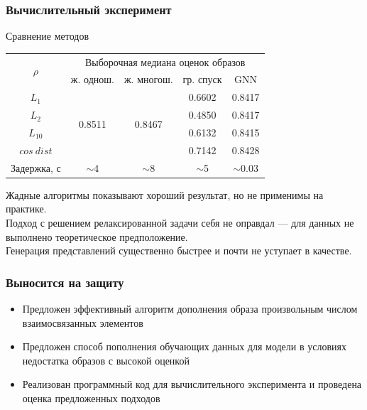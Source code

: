 \documentclass[10pt]{beamer}
\begin{document}
\begin{frame}
	\frametitle{Вычислительный эксперимент}
	\begin{block}{Сравнение методов}
		\begin{center}
			\begin{tabular}{|c|cccc|}
				\hline
				\multirow{2}{*}{$\rho$} & \multicolumn{4}{c|}{Выборочная медиана оценок образов}                                                                       \\ \cline{2-5} 
				& \multicolumn{1}{c|}{ж. однош.}            & \multicolumn{1}{c|}{ж. многош.}           & \multicolumn{1}{c|}{гр. спуск} & GNN \\ \hline
				$L_1$                   & \multicolumn{1}{c|}{\multirow{4}{*}{0.8511}} & \multicolumn{1}{c|}{\multirow{4}{*}{0.8467}} & \multicolumn{1}{c|}{0.6602}         & 0.8417    \\ \cline{1-1} \cline{4-5} 
				$L_2$                   & \multicolumn{1}{c|}{}                     & \multicolumn{1}{c|}{}                     & \multicolumn{1}{c|}{0.4850}         & 0.8417  \\ \cline{1-1} \cline{4-5} 
				$L_{10}$                & \multicolumn{1}{c|}{}                     & \multicolumn{1}{c|}{}                     & \multicolumn{1}{c|}{0.6132}         &  0.8415  \\ \cline{1-1}\cline{4-5} 
				$cos~dist$              & \multicolumn{1}{c|}{}                     & \multicolumn{1}{c|}{}                     & \multicolumn{1}{c|}{0.7142}         &  0.8428  \\ \hline
				Задержка, с             & \multicolumn{1}{c|}{$\sim$4}                     & \multicolumn{1}{c|}{$\sim$8}                     & \multicolumn{1}{c|}{$\sim$5}          &   $\sim$0.03  \\ \hline
			\end{tabular}
		\end{center}
		Жадные алгоритмы показывают хороший результат, но не применимы на практике. \\
		Подход с решением релаксированной задачи себя не оправдал --- для данных не выполнено теоретическое предположение.\\
		Генерация представлений существенно быстрее и почти не уступает в качестве.
	\end{block}
\end{frame}



\begin{frame}
	\frametitle{Выносится на защиту}
		\begin{itemize}
			\item Предложен эффективный алгоритм дополнения образа произвольным числом взаимосвязанных элементов
			\item Предложен способ пополнения обучающих данных для модели в условиях недостатка образов с высокой оценкой
			\item Реализован программный код для вычислительного эксперимента и проведена оценка предложенных подходов				
		\end{itemize}
\end{frame}
\end{document}
